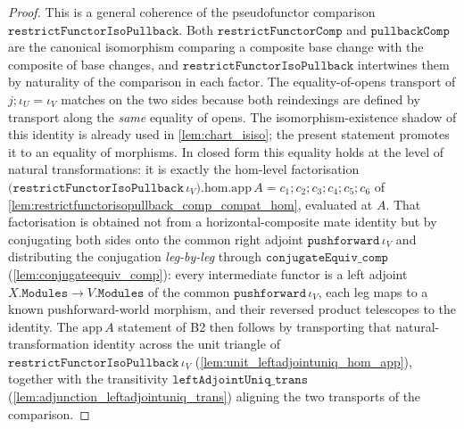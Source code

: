 \begin{proof}
  \leanok
  This is a general coherence of the pseudofunctor comparison
  \(\mathtt{restrictFunctorIsoPullback}\). Both \(\mathtt{restrictFunctorComp}\) and
  \(\mathtt{pullbackComp}\) are the canonical isomorphism comparing a composite base change with the
  composite of base changes, and \(\mathtt{restrictFunctorIsoPullback}\) intertwines them by
  naturality of the comparison in each factor. The equality-of-opens transport of
  \(j \mathbin{;} \iota_U = \iota_V\) matches on the two sides because both reindexings are defined by
  transport along the \emph{same} equality of opens. The isomorphism-existence shadow of this
  identity is already used in \cref{lem:chart_isiso}; the present statement promotes it to an
  equality of morphisms. In closed form this equality holds at the level of natural transformations:
  it is exactly the hom-level factorisation
  \(\bigl(\mathtt{restrictFunctorIsoPullback}\,\iota_V\bigr).\mathrm{hom}.\mathrm{app}\,A
  = c_1 \mathbin{;} c_2 \mathbin{;} c_3 \mathbin{;} c_4 \mathbin{;} c_5 \mathbin{;} c_6\) of
  \cref{lem:restrictfunctorisopullback_comp_compat_hom}, evaluated at \(A\). That factorisation is
  obtained not from a horizontal-composite mate identity but by conjugating both sides onto the
  common right adjoint \(\mathtt{pushforward}\,\iota_V\) and distributing the conjugation
  \emph{leg-by-leg} through \(\mathtt{conjugateEquiv\_comp}\) (\cref{lem:conjugateequiv_comp}): every
  intermediate functor is a left adjoint \(X.\mathtt{Modules} \to V.\mathtt{Modules}\) of the common
  \(\mathtt{pushforward}\,\iota_V\), each leg maps to a known pushforward-world morphism, and their
  reversed product telescopes to the identity. The \(\mathrm{app}\,A\) statement of B2 then follows
  by transporting that natural-transformation identity across the unit triangle of
  \(\mathtt{restrictFunctorIsoPullback}\,\iota_V\) (\cref{lem:unit_leftadjointuniq_hom_app}),
  together with the transitivity \(\mathtt{leftAdjointUniq\_trans}\)
  (\cref{lem:adjunction_leftadjointuniq_trans}) aligning the two transports of the comparison.
\end{proof}

